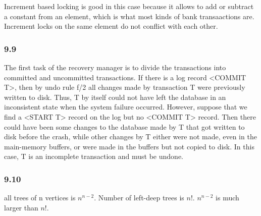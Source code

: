 \documentclass{article}
\begin{document}
Increment based locking is good in this case because it allows to add or subtract a constant
from an element, which is what most kinds of bank transaactions are. Increment locks on the same
element do not conflict with each other.
\subsubsection{9.9}

The first task of the recovery manager is to divide the transactions into
committed and uncommitted transactions. If there is a log record <COMMIT T>,
then by undo rule f/2 all changes made by transaction T were previously written
to disk. Thus, T by itself could not have left the database in an inconsistent
state when the system failure occurred.
However, suppose that we find a <START T> record on the log but no
<COMMIT T> record. Then there could have been some changes to the database
made by T that got written to disk before the crash, while other changes by
T either were not made, even in the main-memory buffers, or were made in
the buffers but not copied to disk. In this case, T is an incomplete transaction
and must be undone.

\subsubsection{9.10}
all trees of n vertices is $n^{n-2}$. Number of left-deep trees is $n!$.
$n^{n-2}$ is much larger than $n!$.
\end{document}
